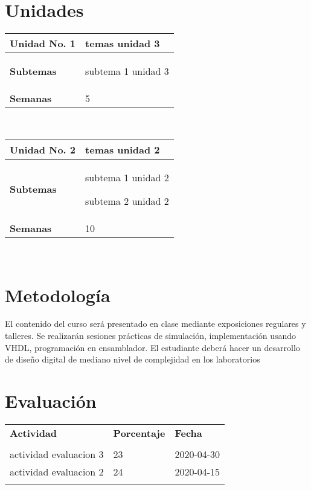 \documentclass[11pt]{article}
\begin{document}
\section*{Unidades}
\noindent 
\begin{tabular}{R{0.16\textwidth} L{0.7\textwidth}} 
 \\ 
\toprule \textbf{Unidad No. 1} & temas unidad 3 
 \\ 
\midrule\textbf{Subtemas} & 
\begin{description}
 \item subtema 1 unidad 3 
\end{description}
 \\ 
\textbf{Semanas} & 5 
\end{tabular} 
 \\ 
 \begin{tabular}{R{0.16\textwidth} L{0.7\textwidth}} 
 \\ 
\toprule \textbf{Unidad No. 2} & temas unidad 2 
 \\ 
\midrule\textbf{Subtemas} & 
\begin{description}
 \item subtema 1 unidad 2 \item subtema 2 unidad 2 
\end{description}
 \\ 
\textbf{Semanas} & 10 
\end{tabular} 
 \\ 
 

\section*{Metodología}

El contenido del curso será presentado en clase mediante exposiciones regulares y talleres. Se realizarán sesiones prácticas de simulación, implementación usando VHDL, programación en ensamblador. El estudiante deberá hacer un desarrollo de diseño digital de mediano nivel de complejidad en los laboratorios

\section*{Evaluación}
\noindent \begin{tabular}{R{0.5\textwidth} C{0.2\textwidth} C{0.2\textwidth}}
	\toprule
	\textbf{Actividad} & \textbf{Porcentaje} & \textbf{Fecha} \\
	\\
	\midrule
	actividad evaluacion 3 & 23 & 2020-04-30 \\ actividad evaluacion 2 & 24 & 2020-04-15 \\ 
	\\
	\midrule
\end{tabular}
\\
\end{document}
